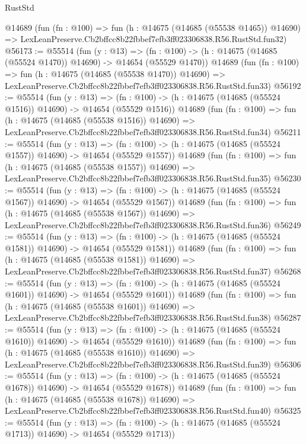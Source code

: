 \begin{lexlean}{RustStd}
\begin{coremodule}
    @14689
    (fun (fn : @100) =>
    fun (h : @14675 (@14685 (@55538 @1465)) @14690) =>
    LexLeanPreserve.Cb2bffcc8b22fbbef7efb3ff023306838.R56.RustStd.fun32)
@56173 := @55514
    (fun (y : @13) =>
    (fn : @100) -> (h : @14675 (@14685 (@55524 @1470)) @14690) -> @14654 (@55529 @1470))
    @14689
    (fun (fn : @100) =>
    fun (h : @14675 (@14685 (@55538 @1470)) @14690) =>
    LexLeanPreserve.Cb2bffcc8b22fbbef7efb3ff023306838.R56.RustStd.fun33)
@56192 := @55514
    (fun (y : @13) =>
    (fn : @100) -> (h : @14675 (@14685 (@55524 @1516)) @14690) -> @14654 (@55529 @1516))
    @14689
    (fun (fn : @100) =>
    fun (h : @14675 (@14685 (@55538 @1516)) @14690) =>
    LexLeanPreserve.Cb2bffcc8b22fbbef7efb3ff023306838.R56.RustStd.fun34)
@56211 := @55514
    (fun (y : @13) =>
    (fn : @100) -> (h : @14675 (@14685 (@55524 @1557)) @14690) -> @14654 (@55529 @1557))
    @14689
    (fun (fn : @100) =>
    fun (h : @14675 (@14685 (@55538 @1557)) @14690) =>
    LexLeanPreserve.Cb2bffcc8b22fbbef7efb3ff023306838.R56.RustStd.fun35)
@56230 := @55514
    (fun (y : @13) =>
    (fn : @100) -> (h : @14675 (@14685 (@55524 @1567)) @14690) -> @14654 (@55529 @1567))
    @14689
    (fun (fn : @100) =>
    fun (h : @14675 (@14685 (@55538 @1567)) @14690) =>
    LexLeanPreserve.Cb2bffcc8b22fbbef7efb3ff023306838.R56.RustStd.fun36)
@56249 := @55514
    (fun (y : @13) =>
    (fn : @100) -> (h : @14675 (@14685 (@55524 @1581)) @14690) -> @14654 (@55529 @1581))
    @14689
    (fun (fn : @100) =>
    fun (h : @14675 (@14685 (@55538 @1581)) @14690) =>
    LexLeanPreserve.Cb2bffcc8b22fbbef7efb3ff023306838.R56.RustStd.fun37)
@56268 := @55514
    (fun (y : @13) =>
    (fn : @100) -> (h : @14675 (@14685 (@55524 @1601)) @14690) -> @14654 (@55529 @1601))
    @14689
    (fun (fn : @100) =>
    fun (h : @14675 (@14685 (@55538 @1601)) @14690) =>
    LexLeanPreserve.Cb2bffcc8b22fbbef7efb3ff023306838.R56.RustStd.fun38)
@56287 := @55514
    (fun (y : @13) =>
    (fn : @100) -> (h : @14675 (@14685 (@55524 @1610)) @14690) -> @14654 (@55529 @1610))
    @14689
    (fun (fn : @100) =>
    fun (h : @14675 (@14685 (@55538 @1610)) @14690) =>
    LexLeanPreserve.Cb2bffcc8b22fbbef7efb3ff023306838.R56.RustStd.fun39)
@56306 := @55514
    (fun (y : @13) =>
    (fn : @100) -> (h : @14675 (@14685 (@55524 @1678)) @14690) -> @14654 (@55529 @1678))
    @14689
    (fun (fn : @100) =>
    fun (h : @14675 (@14685 (@55538 @1678)) @14690) =>
    LexLeanPreserve.Cb2bffcc8b22fbbef7efb3ff023306838.R56.RustStd.fun40)
@56325 := @55514
    (fun (y : @13) =>
    (fn : @100) -> (h : @14675 (@14685 (@55524 @1713)) @14690) -> @14654 (@55529 @1713))

\end{coremodule}
\end{lexlean}
